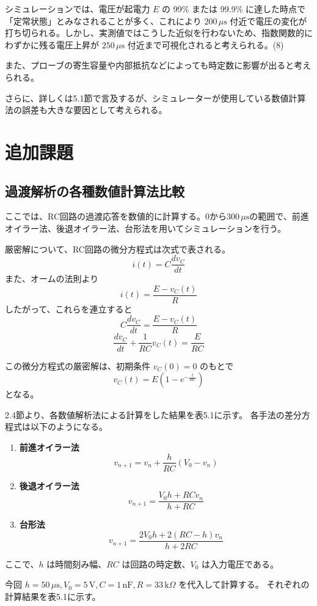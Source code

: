 \documentclass{jlreq}
\numberwithin{equation}{section}
\begin{document}
シミュレーションでは、電圧が起電力 $E$ の 99\% または 99.9\% に達した時点で「定常状態」とみなされることが多く、これにより $200\,\mu\mathrm{s}$ 付近で電圧の変化が打ち切られる。しかし、実測値ではこうした近似を行わないため、指数関数的にわずかに残る電圧上昇が $250\,\mu\mathrm{s}$ 付近まで可視化されると考えられる。(8)

また、プローブの寄生容量や内部抵抗などによっても時定数に影響が出ると考えられる。

さらに、詳しくは5.1節で言及するが、シミュレーターが使用している数値計算法の誤差も大きな要因として考えられる。

\section{追加課題}

\subsection{過渡解析の各種数値計算法比較}
ここでは、RC回路の過渡応答を数値的に計算する。$0$から$300\,\mu\mathrm{s}$の範囲で、前進オイラー法、後退オイラー法、台形法を用いてシミュレーションを行う。

厳密解について、RC回路の微分方程式は次式で表される。
\[
i(t) = C \frac{dv_C}{dt}
\]
また、オームの法則より
\[
i(t) = \frac{E - v_C(t)}{R}
\]
したがって、これらを連立すると
\[
C \frac{dv_C}{dt} = \frac{E - v_C(t)}{R}
\]
\[
\frac{dv_C}{dt} + \frac{1}{RC} v_C(t) = \frac{E}{RC}
\]

この微分方程式の厳密解は、初期条件 \( v_C(0) = 0 \) のもとで
\[
v_C(t) = E \left( 1 - e^{- \frac{t}{RC}} \right)
\]
となる。

2.4節より、各数値解析法による計算をした結果を表5.1に示す。
各手法の差分方程式は以下のようになる。

\begin{enumerate}
  \item \textbf{前進オイラー法}
  \[
    v_{n+1} = v_n + \frac{h}{RC}(V_0 - v_n)
  \]
  \item \textbf{後退オイラー法}
  \[
    v_{n+1} = \frac{V_0 h + RC v_n}{h + RC}
  \]
  \item \textbf{台形法}
  \[
    v_{n+1} = \frac{2 V_0 h + 2 (RC - h) v_n}{h + 2RC}
  \]
\end{enumerate}

ここで、\( h \) は時間刻み幅、\( RC \) は回路の時定数、\( V_0 \) は入力電圧である。

今回 \( h = 50 \, \mu\mathrm{s}, V_0 = 5 \, \mathrm{V}, C = 1 \, \mathrm{nF}, R = 33 \, \mathrm{k}\Omega \) を代入して計算する。
それぞれの計算結果を表5.1に示す。
\end{document}
